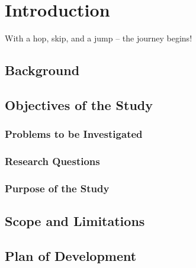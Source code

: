 \chapter{Introduction}
\label{chap:intro}

With a hop, skip, and a jump -- the journey begins!

\section{Background}
\section{Objectives of the Study}
\subsection{Problems to be Investigated}
\subsection{Research Questions}
\subsection{Purpose of the Study}
\section{Scope and Limitations}
\section{Plan of Development}